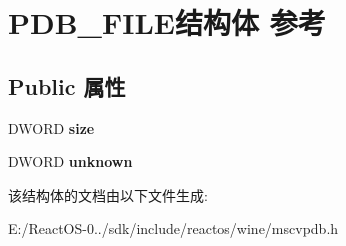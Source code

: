 \hypertarget{struct_p_d_b___f_i_l_e}{}\section{P\+D\+B\+\_\+\+F\+I\+L\+E结构体 参考}
\label{struct_p_d_b___f_i_l_e}
\subsection*{Public 属性}
\begin{DoxyCompactItemize}
\item 
\mbox{\label{struct_p_d_b___f_i_l_e_a175805aeb587f08a2c25f07be081f08b}} 
D\+W\+O\+RD {\bfseries size}
\item 
\mbox{\label{struct_p_d_b___f_i_l_e_a9b9b37f5641cbc37e1caf9593ac656fb}} 
D\+W\+O\+RD {\bfseries unknown}
\end{DoxyCompactItemize}


该结构体的文档由以下文件生成\+:\begin{DoxyCompactItemize}
\item 
E\+:/\+React\+O\+S-\/0../sdk/include/reactos/wine/mscvpdb.\+h\end{DoxyCompactItemize}
